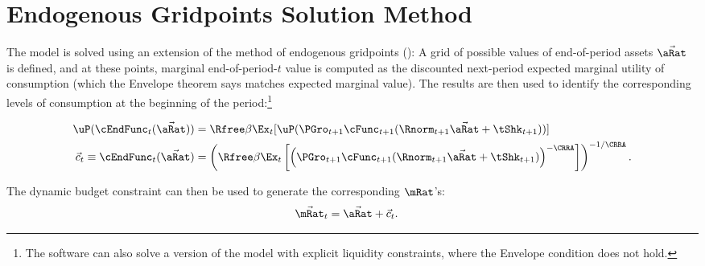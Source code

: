 \documentclass[\econtexRoot/BufferStockTheory]{subfiles}
\begin{document}
\section{Endogenous Gridpoints Solution Method}

The model is solved using an extension of the method of endogenous gridpoints (\cite{carrollEGM}): A grid of possible values of end-of-period assets $\vec{\aRat}$ is defined, and at these points, marginal end-of-period-$t$ value is computed as the discounted next-period expected marginal utility of consumption (which the Envelope theorem says matches expected marginal value).  The results are then used to identify the corresponding levels of consumption at the beginning of the period:\footnote{The software can also solve a version of the model with explicit liquidity constraints, where the Envelope condition does not hold.}

\begin{align}
  \uP(\cEndFunc_{t}(\vec{\aRat}))  & = \Rfree \beta \Ex_{t}[ \uP(\PGro_{t+1}
  \cFunc_{t+1}(\Rnorm_{t+1}\vec{\aRat} + \tShk_{t+1}))] \label{eq:cEulerEndog}
\\ \vec{c}_{t} \equiv \cEndFunc_{t}(\vec{\aRat})  & = \left(\Rfree \beta \Ex_{t}\left[ \left(\PGro_{t+1}
      \cFunc_{t+1}(\Rnorm_{t+1}\vec{\aRat} +
      \tShk_{t+1})\right)^{-\CRRA}\right]\right)^{-1/\CRRA}. \notag
\end{align}

The dynamic budget constraint can then be used to generate the corresponding $\mRat$'s:
\begin{eqnarray*}
  \vec{\mRat}_{t}  & = \vec{\aRat}+\vec{c}_{t}.
\end{eqnarray*}
\end{document}
